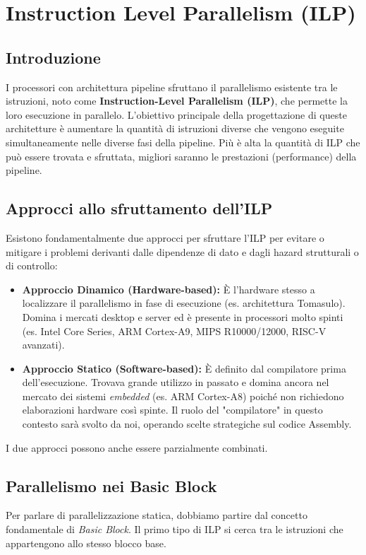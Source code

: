 \chapter{Instruction Level Parallelism (ILP)}

\section{Introduzione}
I processori con architettura pipeline sfruttano il parallelismo esistente tra le istruzioni, noto come \textbf{Instruction-Level Parallelism (ILP)}, che permette la loro esecuzione in parallelo. 
L'obiettivo principale della progettazione di queste architetture è aumentare la quantità di istruzioni diverse che vengono eseguite simultaneamente nelle diverse fasi della pipeline. Più è alta la quantità di ILP che può essere trovata e sfruttata, migliori saranno le prestazioni (performance) della pipeline.

\section{Approcci allo sfruttamento dell'ILP}
Esistono fondamentalmente due approcci per sfruttare l'ILP per evitare o mitigare i problemi derivanti dalle dipendenze di dato e dagli hazard strutturali o di controllo:

\begin{itemize}
    \item \textbf{Approccio Dinamico (Hardware-based):} È l'hardware stesso a localizzare il parallelismo in fase di esecuzione (es. architettura Tomasulo). Domina i mercati desktop e server ed è presente in processori molto spinti (es. Intel Core Series, ARM Cortex-A9, MIPS R10000/12000, RISC-V avanzati).
    \item \textbf{Approccio Statico (Software-based):} È definito dal compilatore prima dell'esecuzione. Trovava grande utilizzo in passato e domina ancora nel mercato dei sistemi \textit{embedded} (es. ARM Cortex-A8) poiché non richiedono elaborazioni hardware così spinte. Il ruolo del "compilatore" in questo contesto sarà svolto da noi, operando scelte strategiche sul codice Assembly.
\end{itemize}
I due approcci possono anche essere parzialmente combinati.

\section{Parallelismo nei Basic Block}
Per parlare di parallelizzazione statica, dobbiamo partire dal concetto fondamentale di \textit{Basic Block}. Il primo tipo di ILP si cerca tra le istruzioni che appartengono allo stesso blocco base.

